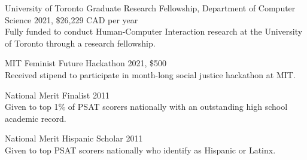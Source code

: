 University of Toronto Graduate Research Fellowship, Department of Computer Science 2021, \$26,229 CAD per year \\
Fully funded to conduct Human-Computer Interaction research at the University of Toronto through a research fellowship. 

MIT Feminist Future Hackathon 2021, \$500 \\
Received stipend to participate in month-long social justice hackathon at MIT. 


National Merit Finalist 2011 \\
Given to top 1\% of PSAT scorers nationally with an outstanding high school academic record. 

National Merit Hispanic Scholar 2011 \\
Given to top PSAT scorers nationally who identify as Hispanic or Latinx. 
